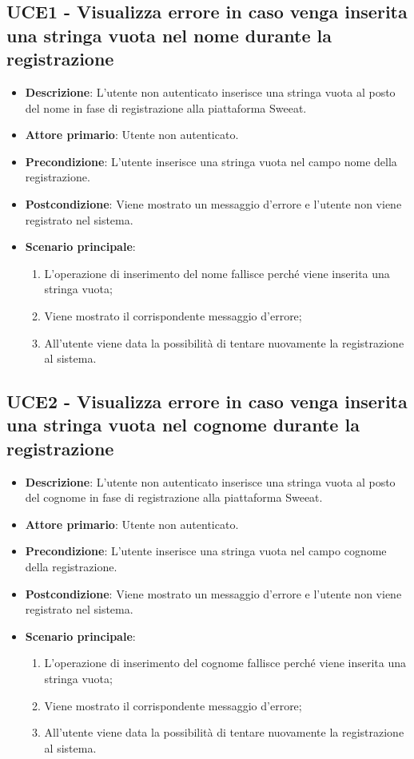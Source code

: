 \subsection{UCE1 - Visualizza errore in caso venga inserita una stringa vuota nel nome durante la registrazione}
\begin{itemize}
\item \textbf{Descrizione}: L'utente non autenticato inserisce una stringa vuota al posto del nome in fase di registrazione alla piattaforma Sweeat.
\item \textbf{Attore primario}: Utente non autenticato.
\item \textbf{Precondizione}: L'utente inserisce una stringa vuota nel campo nome della registrazione.
\item \textbf{Postcondizione}: Viene mostrato un messaggio d'errore e l'utente non viene registrato nel sistema.

\item \textbf{Scenario principale}:
\begin{enumerate}
\item L'operazione di inserimento del nome fallisce perché viene inserita una stringa vuota;
\item Viene mostrato il corrispondente messaggio d'errore;
\item All'utente viene data la possibilità di tentare nuovamente la registrazione al sistema.
\end{enumerate}
\end{itemize}

\subsection{UCE2 - Visualizza errore in caso venga inserita una stringa vuota nel cognome durante la registrazione}
\begin{itemize}
\item \textbf{Descrizione}: L'utente non autenticato inserisce una stringa vuota al posto del cognome in fase di registrazione alla piattaforma Sweeat.
\item \textbf{Attore primario}: Utente non autenticato.
\item \textbf{Precondizione}: L'utente inserisce una stringa vuota nel campo cognome della registrazione.
\item \textbf{Postcondizione}: Viene mostrato un messaggio d'errore e l'utente non viene registrato nel sistema.

\item \textbf{Scenario principale}:
\begin{enumerate}
\item L'operazione di inserimento del cognome fallisce perché viene inserita una stringa vuota;
\item Viene mostrato il corrispondente messaggio d'errore;
\item All'utente viene data la possibilità di tentare nuovamente la registrazione al sistema.
\end{enumerate}
\end{itemize}

